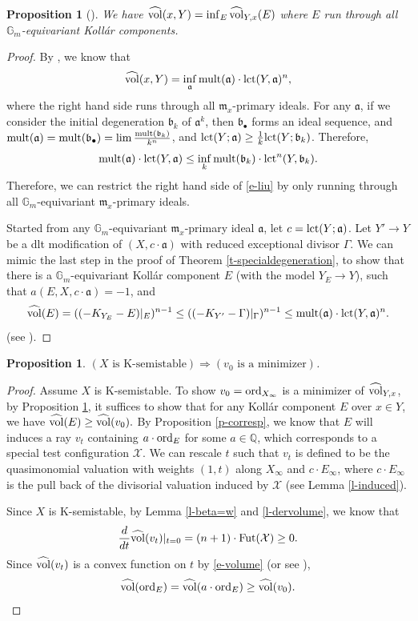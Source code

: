 \documentclass[12pt,reqno]{amsart}%
\newcommand{\cX}{{\mathcal{X}}}
\newcommand{\mult}{{\rm mult}}
\newcommand{\ord}{{\rm ord}}
\newtheorem{prop}[thm]{Proposition}
\theoremstyle{definition}
\theoremstyle{remark}
\newcommand{\Fut}{{\rm Fut}}
\newcommand{\hvol}{\widehat{\rm vol}}
\newcommand{\fa}{{\mathfrak{a}}}
\newcommand{\fm}{{\mathfrak{m}}}
\newcommand{\lct}{{\rm lct}}
\newcommand{\fb}{{\mathfrak{b}}}
\begin{document}
\begin{subappendices}
\begin{prop}[{\cite[Proposition 4.4]{LX20}}]\label{p-kollar}
We have $\hvol(x,Y)=\inf_E \hvol_{Y,x}(E)$ where $E$ run through all $\mathbb{G}_m$-equivariant Koll\'ar components.
\end{prop}
\begin{proof}By \cite[Theorem 7]{Liu18}, we know that 
\begin{eqnarray}\label{e-liu}
\hvol(x,Y)=\inf_{\fa}\mult(\fa)\cdot\lct(Y,\fa)^n,
\end{eqnarray}
where the right hand side runs through all $\fm_x$-primary ideals. For any $\fa$, if we consider the initial degeneration $\fb_k$ of $\fa^k$, then $\fb_{\bullet}$ forms an ideal sequence, and $\mult(\fa)=\mult(\fb_{\bullet})=\lim\frac{\mult(\fb_k)}{k^n}$, and $\lct(Y;\fa)\ge \frac{1}{k}\lct(Y;\fb_k)$. Therefore,
$$ \mult(\fa)\cdot\lct(Y,\fa)\le \inf_k  \mult(\fb_k)\cdot\lct^n(Y,\fb_k) .$$
Therefore, we can restrict the right hand side of \eqref{e-liu} by only running through all $\mathbb{G}_m$-equivariant $\fm_x$-primary ideals. 

Started from any $\mathbb{G}_m$-equivariant $\fm_x$-primary ideal $\fa$, let $c=\lct(Y;\fa)$. Let $Y'\to Y$ be a dlt modification of $(X,c\cdot \fa)$ with reduced exceptional divisor $\Gamma$. We can mimic the last step in the proof of Theorem \ref{t-specialdegeneration}, to show that there is a $\mathbb{G}_m$-equivariant Koll\'ar component $E$ (with the model $Y_E\to Y$), such that $a(E, X, c\cdot\fa)=-1$,
and 
\[
\hvol(E)=((-K_{Y_E}-E)|_E)^{n-1}\le ((-K_{Y'}-\Gamma)|_\Gamma)^{n-1}\le \mult(\fa)\cdot\lct(Y,\fa)^n.
\]
(see \cite[Section 3.1]{LX20}). %
\end{proof}



\begin{prop}\label{p-kimpliesm}
$(X\mbox{ is K-semistable})\Longrightarrow(\mbox{$v_0$ is a minimizer})$.
\end{prop} 
 \begin{proof}Assume $X$ is K-semistable. To show $v_0=\ord_{X_{\infty}}$ is a minimizer of $\hvol_{Y,x}$, by Proposition \ref{p-kollar}, it suffices to show that for any Koll\'ar component $E$ over $x\in Y$, we have $\hvol(E)\ge \hvol(v_0).$ By Proposition \ref{p-corresp}, we know that $E$ will induces a ray $v_t$ containing $a\cdot \ord_E$ for some $a\in \mathbb{Q}$, which corresponds to a special test configuration $\cX$. We can rescale $t$ such that $v_t$ is defined to be the quasimonomial valuation with weights $(1,t)$ along $X_\infty$ and $c\cdot E_{\infty}$, where $c\cdot E_{\infty}$ is the pull back of the divisorial valuation induced by $\cX$ (see Lemma \ref{l-induced}). 
 
Since $X$ is K-semistable, by Lemma \ref{l-beta=w} and \ref{l-dervolume}, we know that 
$$\frac{d}{dt}\hvol{(v_t)}|_{t=0}= (n+1)\cdot \Fut(\cX)\ge 0.$$
Since $\hvol(v_t)$ is a convex function on $t$ by \eqref{e-volume} (or see \cite[Section 3.2]{LX18}),
\[\hvol(\ord_E)=\hvol(a\cdot \ord_E)\ge \hvol(v_0).
\] 
 \end{proof}
 
\end{subappendices}
\end{document}

